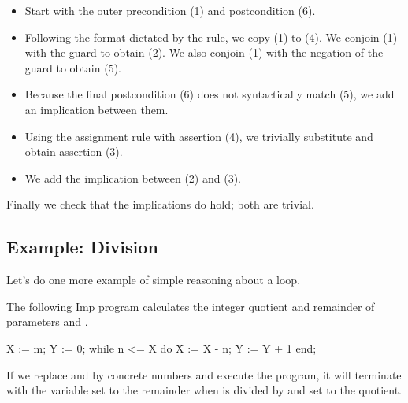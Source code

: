 \documentclass[12pt]{report}
\begin{document}
\begin{itemize}
\item  Start with the outer precondition (1) and postcondition (6).



\item  Following the format dictated by the  rule, we copy
       (1) to (4). We conjoin (1) with the guard to obtain (2). We also
       conjoin (1) with the negation of the guard to obtain (5).



\item  Because the final postcondition (6) does not syntactically match (5),
       we add an implication between them.



\item  Using the assignment rule with assertion (4), we trivially substitute
       and obtain assertion (3).



\item  We add the implication between (2) and (3).

\end{itemize}


   Finally we check that the implications do hold; both are trivial. 
\begin{coqdoccode}
\coqdocemptyline
\end{coqdoccode}
\subsection{Example: Division}



 Let's do one more example of simple reasoning about a loop.


    The following Imp program calculates the integer quotient and
    remainder of parameters  and .


       X := m;
       Y := 0;
       while n <= X do
         X := X - n;
         Y := Y + 1
       end;


    If we replace  and  by concrete numbers and execute the program, it
    will terminate with the variable  set to the remainder when 
    is divided by  and  set to the quotient. 
\end{document}
